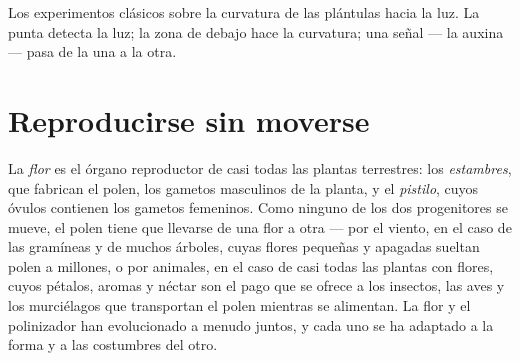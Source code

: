 \begin{omfigure}

{\small Los experimentos clásicos sobre la curvatura de las plántulas
hacia la luz. La punta detecta la luz; la zona de debajo hace la
curvatura; una señal --- la auxina --- pasa de la una a la otra.}
\end{omfigure}

\section{Reproducirse sin moverse}

\begin{proposition}\label{prop:g12:plant-rooted-life:flowers}
La \emph{flor} es el órgano reproductor de casi todas las plantas
terrestres: los \emph{estambres}, que fabrican el polen, los gametos
masculinos de la planta, y el \emph{pistilo}, cuyos óvulos contienen
los gametos femeninos. Como ninguno de los dos progenitores se mueve,
el polen tiene que llevarse de una flor a otra --- por el viento, en el
caso de las gramíneas y de muchos árboles, cuyas flores pequeñas y
apagadas sueltan polen a millones, o por animales, en el caso de casi
todas las plantas con flores, cuyos pétalos, aromas y néctar son el
pago que se ofrece a los insectos, las aves y los murciélagos que
transportan el polen mientras se alimentan. La flor y el polinizador
han evolucionado a menudo juntos, y cada uno se ha adaptado a la forma
y a las costumbres del otro.
\end{proposition}
\admitted


